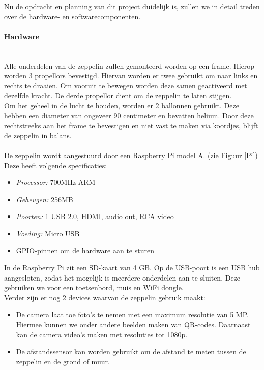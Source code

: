 \documentclass{peno-opdracht2}
\begin{document}
\maketitle

Nu de opdracht en planning van dit project duidelijk is, zullen we in detail treden over de hardware- en softwarecomponenten. 
\paragraph{Hardware} ~\\
Alle onderdelen van de zeppelin zullen gemonteerd worden op een frame. Hierop worden 3 propellors bevestigd. Hiervan worden er twee gebruikt om naar links en rechts te draaien. Om vooruit te bewegen worden deze samen geactiveerd met dezelfde kracht. De derde propellor dient om de zeppelin te laten stijgen. ~\\

Om het geheel in de lucht te houden, worden er 2 ballonnen gebruikt. Deze hebben een diameter van ongeveer 90 centimeter en bevatten helium. Door deze rechtstreeks aan het frame te bevestigen en niet vast te maken via koordjes, blijft de zeppelin in balans.\\
\\
De zeppelin wordt aangestuurd door een Raspberry Pi model A. (zie Figuur \ref{Pi}) Deze heeft volgende specificaties: 
\begin{itemize}
	\item \emph{Processor:} 700MHz ARM
	\item \emph{Geheugen:} 256MB 
	\item \emph{Poorten:} 1 USB 2.0, HDMI, audio out, RCA video
	\item \emph{Voeding:} Micro USB
	\item GPIO-pinnen om de hardware aan te sturen
\end{itemize}

In de Raspberry Pi zit een SD-kaart van 4 GB. Op de USB-poort is een USB hub aangesloten, zodat het mogelijk is meerdere onderdelen aan te sluiten. Deze gebruiken we voor een toetsenbord, muis en WiFi dongle. \\

Verder zijn er nog 2 devices waarvan de zeppelin gebruik maakt:
\begin{itemize}
	\item De camera laat toe foto's te nemen met een maximum resolutie van 5 MP. Hiermee kunnen we onder andere beelden maken van QR-codes. Daarnaast kan de camera video's maken met resoluties tot 1080p. 
	\item De afstandssensor kan worden gebruikt om de afstand te meten tussen de zeppelin en de grond of muur.\\
\end{itemize}
\end{document}
